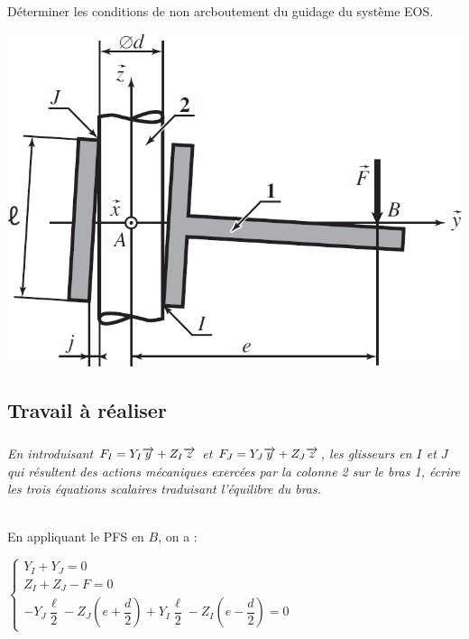 \documentclass[10pt,fleqn]{article} %
\begin{document}
\begin{multicols}{2}
\fi

\begin{obj}
Déterminer les conditions de non arcboutement du guidage du système EOS. 
\end{obj}


\ifprof
\else
\begin{center}
\includegraphics[width=\linewidth]{images/fig_01}
\end{center}

\fi

\subsection*{Travail à réaliser}
\subparagraph{}\textit{En introduisant $F_I = Y_ I \overrightarrow{y} + Z_ I \overrightarrow{z}$ et $F_J = Y_ J \overrightarrow{y} + Z_ J \overrightarrow{z}$, les glisseurs en $I$ et $J$ qui résultent des actions mécaniques exercées par la colonne 2 sur le bras 1, écrire les trois équations scalaires traduisant l’équilibre du bras.}
\ifprof
\begin{corrige}~\\

En appliquant le PFS en $B$, on a : 

$\left\{
\begin{array}{l}
Y_I + Y_J = 0 \\
Z_I + Z_J -F = 0 \\ 
-Y_J \dfrac{\ell}{2}-Z_J \left(e+\dfrac{d}{2}\right) 
+Y_I \dfrac{\ell}{2}-Z_I \left(e-\dfrac{d}{2}\right) = 0
\end{array}
\right.$
%
\end{corrige}



\end{multicols}
\end{document}

